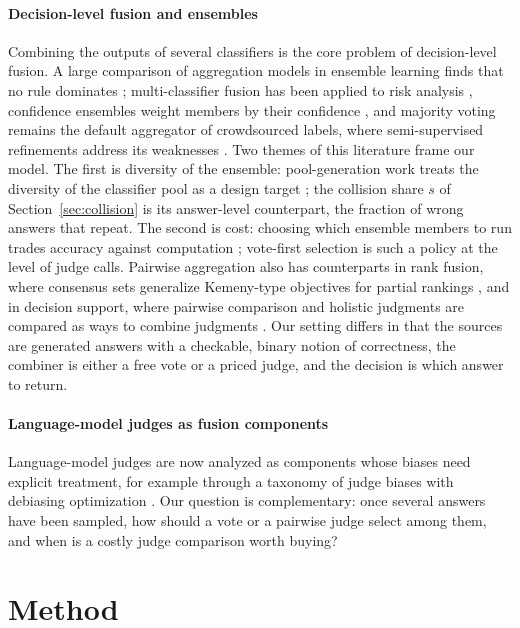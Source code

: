 \documentclass[preprint,11pt,number,sort&compress]{elsarticle}
\begin{document}
\paragraph{Decision-level fusion and ensembles}
Combining the outputs of several classifiers is the core problem of
decision-level fusion. A large comparison of aggregation models in ensemble
learning finds that no rule dominates \citep{campagner2023aggregation};
multi-classifier fusion has been applied to risk analysis \citep{pan2020multiclassifier},
confidence ensembles weight members by their confidence \citep{zoppi2025confidence},
and majority voting remains the default aggregator of crowdsourced labels, where
semi-supervised refinements address its weaknesses \citep{yu2026semisupervised}.
Two themes of this literature frame our model. The first is diversity of the
ensemble: pool-generation work treats the diversity of the classifier pool as a
design target \citep{monteiro2023diversity}; the collision share $s$ of
Section~\ref{sec:collision} is its answer-level counterpart, the fraction of wrong
answers that repeat. The second is cost: choosing which ensemble members to run
trades accuracy against computation \citep{birman2022costeffective}; vote-first
selection is such a policy at the level of judge calls. Pairwise aggregation also
has counterparts in rank fusion, where consensus sets generalize Kemeny-type objectives
for partial rankings \citep{aledo2025consensus}, and in decision support, where
pairwise comparison and holistic judgments are compared as ways to combine
judgments \citep{saenzroyo2025divide}. Our setting differs in that the sources are
generated answers with a checkable, binary notion of correctness, the combiner is
either a free vote or a priced judge, and the decision is which answer to return.

\paragraph{Language-model judges as fusion components}
Language-model judges are now analyzed as components whose biases need explicit
treatment, for example through a taxonomy of judge biases with debiasing
optimization \citep{zhou2026robustjudges}. Our question is complementary: once
several answers have been sampled, how should a vote or a pairwise judge select
among them, and when is a costly judge comparison worth buying?


\section{Method}
\end{document}
